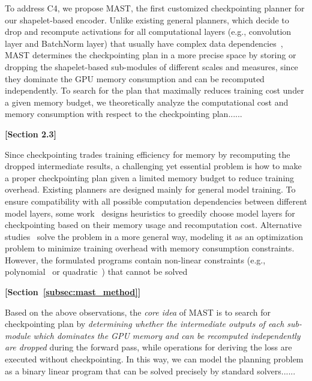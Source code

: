 \begin{sloppypar}
\begin{framed}
To address C4, we propose \textsf{MAST}, the first customized checkpointing planner for our shapelet-based encoder. Unlike existing general planners, which decide to drop and recompute activations for all computational layers (e.g., convolution layer and BatchNorm layer) that usually have complex data dependencies~\cite{jain2020checkmate}, MAST determines the checkpointing plan in a more precise space by storing or dropping the shapelet-based sub-modules of different scales and measures, since they dominate the GPU memory consumption and can be recomputed independently. To search for the  plan that maximally reduces training cost under a given memory budget, we theoretically analyze the computational cost and memory consumption with respect to the checkpointing plan......

\textbf{[Section 2.3]}

Since checkpointing trades training efficiency for memory by recomputing the dropped intermediate results, a challenging yet essential problem is how to make a proper checkpointing plan given a limited memory budget to reduce training overhead. Existing planners are designed mainly for general model training. To ensure compatibility with all possible computation dependencies between different model layers, some work~\cite{sublinear,mimose,DTR} designs heuristics to greedily choose model layers for checkpointing based on their memory usage and recomputation cost.  Alternative studies~\cite{jain2020checkmate,monet} solve the problem in a more general way, modeling it as an optimization problem to minimize training overhead with memory consumption constraints. However, the formulated programs contain non-linear constraints (e.g., polynomial~\cite{jain2020checkmate} or quadratic~\cite{monet}) that cannot be solved   

\textbf{[Section~\ref{subsec:mast_method}]}

Based on the above observations, the \textit{core idea} of MAST is to search for  checkpointing plan by \textit{determining whether the intermediate outputs of each sub-module which dominates the GPU memory and can be recomputed independently are dropped} during the forward pass, while operations for deriving the loss are executed without checkpointing. In this way, we can model the planning problem as a binary linear program that can be solved precisely by standard solvers......
\end{framed}


\end{sloppypar}
